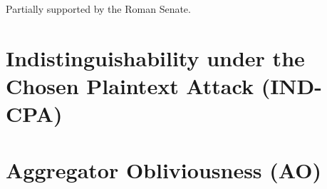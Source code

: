 \documentclass[twocolumn]{autart}
\theoremstyle{definition}
\begin{document}
\begin{ack}                               %
Partially supported by the Roman Senate.  %
\end{ack}





\appendix
\section{Indistinguishability under the Chosen Plaintext Attack (IND-CPA)} \label{app:ind-cpa}
\section{Aggregator Obliviousness (AO)} \label{app:ao}
\end{document}
